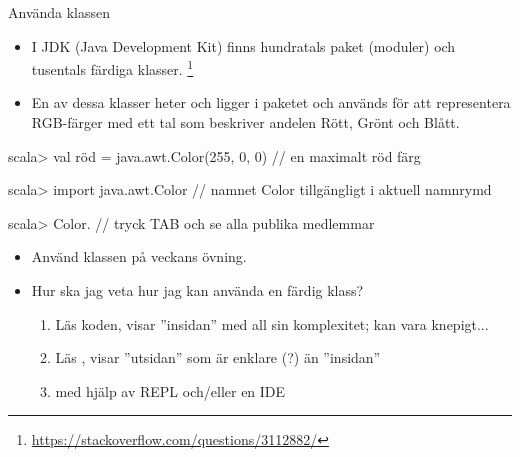 \begin{Slide}{Använda klassen }\SlideFontSmall
\begin{itemize}
\item I JDK (Java Development Kit) finns hundratals paket (moduler) och tusentals färdiga klasser.
\footnote{\SlideFontTiny\url{https://stackoverflow.com/questions/3112882/}}

\item En av dessa klasser heter  och ligger i paketet  och används för att representera RGB-färger med ett tal som beskriver andelen Rött, Grönt och Blått.
\end{itemize}
\begin{REPL}
scala> val röd = java.awt.Color(255, 0, 0)    //  en maximalt röd färg

scala> import java.awt.Color  // namnet Color tillgängligt i aktuell namnrymd

scala> Color.    // tryck TAB och se alla publika medlemmar
\end{REPL}
\pause
\begin{itemize}
\item Använd klassen  på veckans övning.
\item Hur ska jag veta hur jag kan använda en färdig klass?
\pause
\begin{enumerate}\SlideFontTiny
  \item Läs koden, visar ''insidan'' med all sin komplexitet; kan vara knepigt...
  \item Läs , visar ''utsidan'' som är enklare (?) än ''insidan''
  \item {} med hjälp av REPL och/eller en IDE
\end{enumerate}
\end{itemize}

\end{Slide}



